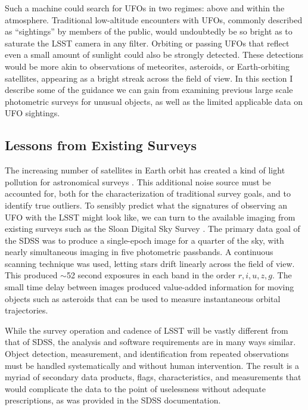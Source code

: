 \documentclass[iop]{emulateapj}
\begin{document}
Such a machine could search for UFOs in two regimes: above and within the atmosphere. Traditional low-altitude encounters with UFOs, commonly described as ``sightings'' by members of the public, would undoubtedly be so bright as to saturate the LSST camera in any filter. Orbiting or passing UFOs that reflect even a small amount of sunlight could also be strongly detected. These detections would be more akin to observations of meteorites, asteroids, or Earth-orbiting satellites, appearing as a bright streak across the field of view. In this section I describe some of the guidance we can gain from examining previous large scale photometric surveys for unusual objects, as well as the limited applicable data on UFO sightings. 

\vspace{0.25in}

\subsection{Lessons from Existing Surveys}
The increasing number of satellites in Earth orbit has created a kind of light pollution for astronomical surveys \citep{1992Msngr..67...53F}. This additional noise source must be accounted for, both for the characterization of traditional survey goals, and to identify true outliers. To sensibly predict what the signatures of observing an UFO with the LSST might look like, we can turn to the available imaging from existing surveys such as the Sloan Digital Sky Survey \citep[SDSS;][]{york2000}. The primary data goal of the SDSS was to produce a single-epoch image for a quarter of the sky, with nearly simultaneous imaging in five photometric passbands. A continuous scanning technique was used, letting stars drift linearly across the field of view. This produced $\sim$52 second exposures in each band in the order $r,i,u,z,g$. The small time delay between images produced value-added information for moving objects such as asteroids that can be used to measure instantaneous orbital trajectories. 

While the survey operation and cadence of LSST will be vastly different from that of SDSS, the analysis and software requirements are in many ways similar. Object detection, measurement, and identification from repeated observations must be handled systematically and without human intervention. The result is a myriad of secondary data products, flags, characteristics, and measurements that would complicate the data to the point of uselessness without adequate prescriptions, as was provided in the SDSS documentation.
\end{document}
